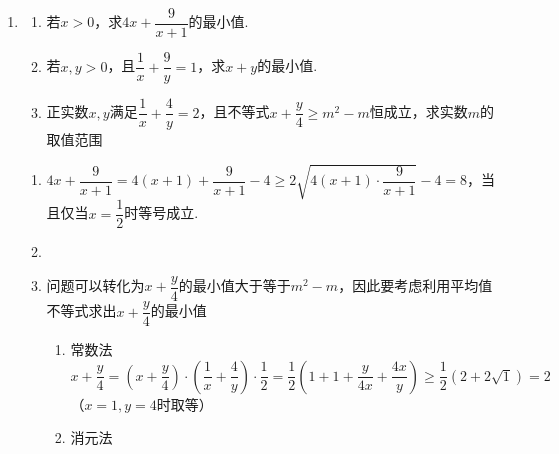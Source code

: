 \begin{enumerate}
\begin{jieda}
        \ps 一正二定三相等 \\
        \ps 和定积最大，积定和最小
    \end{jieda}
    \item 
    \begin{enumerate}
        \item 若$x > 0$，求$4x+\dfrac{9}{x+1}$的最小值.
        \item 若$x, y > 0$，且$\dfrac{1}{x} + \dfrac{9}{y} = 1$，求$x+y$的最小值.
        \item 正实数$x, y$满足$\dfrac{1}{x} + \dfrac{4}{y} = 2$，且不等式$x + \dfrac{y}{4} \geq m^2 - m$恒成立，求实数$m$的取值范围
    \end{enumerate}
    \begin{jieda}
        \begin{enumerate}
            \item $4x+\dfrac{9}{x+1} = 4(x+1)+\dfrac{9}{x+1} - 4 \geq 2\sqrt{4(x+1) \cdot \dfrac{9}{x+1}} - 4 = 8$，当且仅当$x = \dfrac{1}{2}$时等号成立.
            \item 
            \item 问题可以转化为$x+\dfrac{y}{4}$的最小值大于等于$m^2 - m$，因此要考虑利用平均值不等式求出$x+\dfrac{y}{4}$的最小值
            \begin{enumerate}
                \item 常数法 \\
                $x+\dfrac{y}{4} = \left(x+\dfrac{y}{4}\right) \cdot \left(\dfrac{1}{x} + \dfrac{4}{y}\right) \cdot \dfrac{1}{2} = \dfrac{1}{2}\left(1 + 1 + \dfrac{y}{4x} + \dfrac{4x}{y}\right) \geq \dfrac{1}{2}(2 + 2\sqrt{1}) = 2$ \\
                （$x = 1, y = 4$时取等）
                \item 消元法 \\

\end{enumerate}
\end{enumerate}
\end{jieda}
\end{enumerate}
